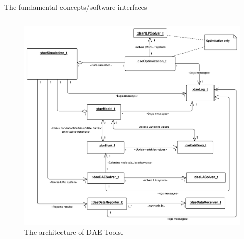 \documentclass[compress,newPxFont,sthlmFooter]{beamer}
\begin{document}
\begin{frame}[plain]{The fundamental concepts/software interfaces}
\begin{columns}
     \begin{column}{0.72\paperwidth}
         \begin{center}
             \begin{figure}
               \includegraphics[width=0.68\paperwidth]{daetools-architecture.png}      
               \caption{The architecture of \alert{DAE Tools}.}
            \end{figure}
         \end{center}
     \end{column}
   \end{columns}
\end{frame}
\end{document}

